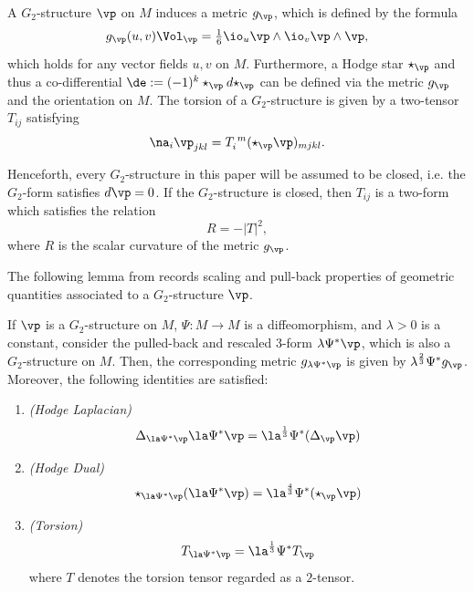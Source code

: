 \documentclass[hidelinks, 12pt, oneside, reqno]{amsart}
\begin{document}
A $G_2$-structure $\vp$ on $M$ induces a metric $g_{\vp}$, which is defined by the formula
\[
g_{\vp}(u,v) \Vol_{\vp} = \tfrac{1}{6}\io_u \vp \wedge \io_v \vp \wedge \vp,
\]
which holds for any vector fields $u,v$ on $M$. Furthermore, a Hodge star $\star_{\vp}$ and thus a co-differential $\de := (-1)^k \star_\vp d \star_\vp$ can be defined via the metric $g_\vp$ and the orientation on $M$. The torsion of a $G_2$-structure is given by a two-tensor $T_{ij}$ satisfying
\begin{equation}\label{equation nabla phi and torsion}\na_i \vp_{jkl} = T_{i}^{\;m}(\star_{\vp} \vp)_{mjkl}.\end{equation}


Henceforth, every $G_2$-structure in this paper will be assumed to be closed, i.e. the $G_2$-form satisfies $d\vp = 0$. If the $G_2$-structure is closed, then $T_{ij}$ is a two-form which satisfies the relation
\begin{equation}\label{equation R = -|T|^2}
    R = -|T|^2,
\end{equation}
where $R$ is the scalar curvature of the metric $g_{\vp}$. 



The following lemma from \cite{HKP} records scaling and pull-back properties of geometric quantities associated to a $G_2$-structure $\vp$.

\begin{lem}\cite[Lemma 2.1]{HKP}\label{lemma scaling of metric}
If $\vp$ is a $G_2$-structure on $M$, $\Psi:M \rightarrow M$ is a diffeomorphism, and $\lambda > 0$ is a constant, consider the pulled-back and rescaled 3-form $\lambda \Psi^* \vp$, which is also a $G_2$-structure on $M$. Then, the corresponding metric $g_{\lambda \Psi^* \vp}$ is given by $\lambda^\frac{2}{3}\Psi^* g_{\vp}$. Moreover, 
the following identities are satisfied:
\begin{enumerate}
\item \textit{(Hodge Laplacian)}
\begin{equation}\label{equation scaling hodge laplacian}
    \Delta_{\la \Psi^* \vp}\la \Psi^* \vp = \la^{\frac{1}{3}}  \Psi^* (\Delta_{\vp} \vp)
\end{equation}
\item \textit{(Hodge Dual)}
\begin{equation}
    \star_{\la \Psi^* \vp} (\la \Psi^* \vp) = \la^{\frac{4}{3}} \Psi^* (\star_\vp \vp)
\end{equation}
\item \textit{(Torsion)}
\begin{equation}
    T_{\la \Psi^* \vp} = \la^{\frac{1}{3}} \Psi^* T_{\vp}
\end{equation}
where $T$ denotes the torsion tensor regarded as a $2$-tensor. 
\end{enumerate}
\end{lem}
\end{document}
